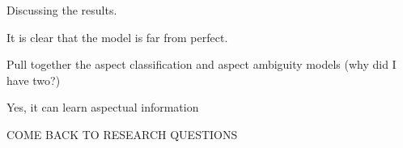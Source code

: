 Discussing the results.

It is clear that the model is far from perfect. 

Pull together the aspect classification and aspect ambiguity models (why did I have two?)

Yes, it can learn aspectual information

COME BACK TO RESEARCH QUESTIONS